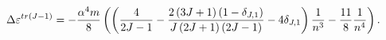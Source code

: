 \begin{equation}
\Delta \varepsilon ^{tr(J-1)}=-\frac{\alpha ^{4}m}{8}\left( \left( \frac{4}{%
2J-1}-\frac{2\left( 3J+1\right) \left( 1-\delta _{J,1}\right) }{J\left(
2J+1\right) \left( 2J-1\right) }-4\delta _{J,1}\right) \frac{1}{n^{3}}-\frac{%
11}{8}\frac{1}{n^{4}}\right) .
\end{equation}

